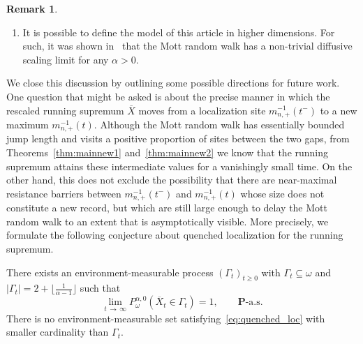 \documentclass[10pt]{amsart}
\theoremstyle{definition}\newtheorem{defi}[theo]{Definition}\newtheorem{rema}[theo]{Remark}\newtheorem{exam}[theo]{Example}\newtheorem{exem}[theo]{Example}\newtheorem{nota}[theo]{Notation}
\renewcommand{\P}{\mathbb P}
\newcommand{\bfP}{\mathbf{P}}
\begin{document}
\begin{rema}
\begin{enumerate}
\[\]
in $\P^{\alpha,\lambda}$-probability, and thus
\[
\P^{\alpha,\lambda}\left(\left(n^{-1}{X}_{L^{-1}(nt)}\right)_{t\,\geq\,0}\in\cdot\right)\rightarrow\bfP\left(\left(m_+^{-1}(t)\right)_{t\,\geq\,0}\in\cdot\right).
\]
In particular, because in this case the walk moves to the right with little backtracking, the exceedance times $(\Delta^+_x)_{x\,\geq\,0}$ should behave like a sum of i.i.d.\ random variables, each representing the time to cross a resistance barrier (which has order proportional to the size of the barrier). Thus we anticipate the exceedance times to grow asymptotically in the same way as the nearest-neighbour resistance, see~\eqref{rscal}, and taking inverses yields the above conclusions. Note that, in contrast to Theorem~\ref{thm:mainnew1}, there is no additional $n$ in the scaling, as the excursions away from the current maximum should not play a significant role in this case.
\item It is possible to define the model of this article in higher dimensions. For such, it was shown in~\cite{CFP} that the Mott random walk has a non-trivial diffusive scaling limit for any $\alpha>0$.
\end{enumerate}
\end{rema}

We close this discussion by outlining some possible directions for future work. One question that might be asked is about the precise manner in which the rescaled running supremum $\overline X$ moves from a localization site $m_{n,+}^{-1}(t^-)$ to a new maximum $m_{n,+}^{-1}(t)$. Although the Mott random walk has essentially bounded jump length and visits a positive proportion of sites between the two gaps, from Theorems~\ref{thm:mainnew1} and~\ref{thm:mainnew2} we know that the running supremum attains these intermediate values for a vanishingly small time. On the other hand, this does not exclude the possibility that there are near-maximal resistance barriers between $m_{n,+}^{-1}(t^-)$ and $m_{n,+}^{-1}(t)$ whose size does not constitute a new record, but which are still large enough to delay the Mott random walk to an extent that is asymptotically visible. More precisely, we formulate the following conjecture about quenched localization for the running supremum.

\begin{conj}\label{con:quenched}
There exists an environment-measurable process $(\Gamma_t)_{t\geq 0}$ with $\Gamma_t\subseteq\omega$ and $|\Gamma_t|=2+\lfloor\frac{1}{\alpha-1}\rfloor$ such that
\begin{equation}\label{eq:quenched_loc}
\lim_{t\,\to\,\infty}P^{\alpha,0}_\omega\left(\overline X_t\in\Gamma_t\right)=1,\qquad \bfP\text{-a.s.}
\end{equation}
There is no environment-measurable set satisfying~\eqref{eq:quenched_loc} with smaller cardinality than $\Gamma_t$.
\end{conj}
\end{document}
